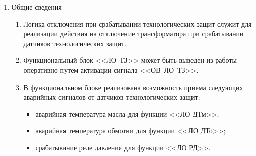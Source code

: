 \documentclass[a4paper, 12pt,table, hidelinks, DIV=calc]{extarticle} %
\begin{document}
\FloatBarrier %
\color{black}


\begin{enumerate}[label=\arabic{section}.\arabic{subsection}.\arabic{enumi}, labelsep=4pt, leftmargin=0pt, itemindent=57pt, itemsep=0pt, parsep=5pt] %

\item Общие сведения

\begin{enumerate}[label=\arabic{section}.\arabic{subsection}.\arabic{enumi}.\arabic*, labelsep=4pt, leftmargin=0em, itemindent=65pt, parsep=0pt]   

\item
Логика отключения при срабатывании технологических защит служит для реализации действия на отключение трансформатора при срабатывании датчиков технологических защит.
\item
Функциональный блок <<ЛО~ТЗ>> может быть выведен из работы оперативно путем активации сигнала <<ОВ~ЛО~ТЗ>>.
\item
В функциональном блоке реализована возможность приема следующих аварийных сигналов от датчиков технологических защит:
\begin{itemize}
\item аварийная температура масла для функции <<ЛО ДТм>>;
\item аварийная температура обмотки для функции <<ЛО ДТо>>;
\item срабатывание реле давления для функции <<ЛО РД>>.
\end{itemize}


\end{enumerate}
\end{enumerate}
\end{document}
